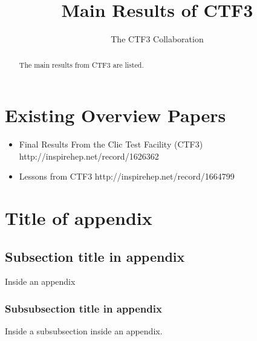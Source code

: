 \documentclass[biblatex]{cernrep}
\begin{document}
\title{Main Results of CTF3}

\author{The CTF3 Collaboration}


\begin{abstract}
The main results from CTF3 are listed.
\end{abstract}


\maketitle




\section{Existing Overview Papers}

\begin{itemize}
\item Final Results From the Clic Test Facility (CTF3)
http://inspirehep.net/record/1626362

\item Lessons from CTF3
http://inspirehep.net/record/1664799
\end{itemize}


















\appendix
\section{Title of appendix}
\label{sec:app}

\subsection{Subsection title in appendix}
Inside an appendix
\subsubsection{Subsubsection title in appendix}
Inside a subsubsection inside an appendix.

\end{document}
